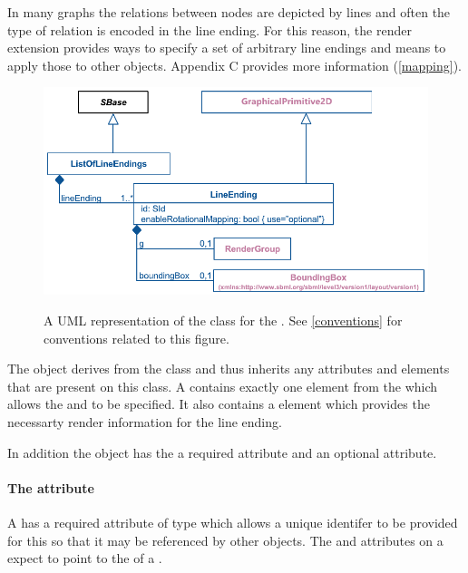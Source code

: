 In many graphs the relations between nodes are depicted by lines and often the 
type of relation is encoded in the line ending. For this reason, the render
extension provides ways to specify a set of arbitrary line endings and means to
apply those to other objects. Appendix C provides more information (\ref{mapping}).

\begin{figure}[h!]
  \centering
  \includegraphics{images/render-line-endings-uml}\\
  \caption{A UML representation of the \LineEnding class for the \RenderPackage.  See \ref{conventions} for conventions related to this figure. }
  \label{fig:line_ending_render_uml}
\end{figure}


The \LineEnding object derives from the \GraphicalPrimitiveTwoD class
and thus inherits any attributes and elements that are present on this
class.
A \LineEnding contains exactly one  element from the \LayoutPackage which allows the  and  to be specified. It also contains a \RenderGroup element which provides the necessarty render information for the line ending.
  
In addition the \LineEnding object has the a required  attribute and an optional  attribute.

\paragraph{The \fixttspace{} attribute}

A \LineEnding has a required attribute  of type
 which allows a unique identifer to be provided for this \LineEnding so that it may be referenced by other objects. The  and  attributes on a \RenderCurve expect to point to the  of a \LineEnding.

